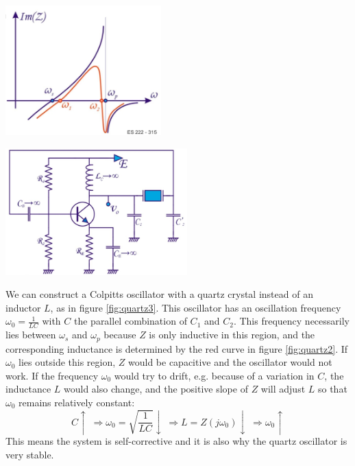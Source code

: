 \begin{minipage}{.5\textwidth}
	\centering
	\includegraphics[width=6cm]{figures/ch11/quartz2.jpg}
	\label{fig:quartz2}
\end{minipage}%
\begin{minipage}{.5\textwidth}
	\centering
	\includegraphics[width=7cm]{figures/ch11/quartz3.jpg}
	\label{fig:quartz3}
\end{minipage}

We can construct a Colpitts oscillator with a quartz crystal instead of an inductor $L$, as in figure \ref{fig:quartz3}. This oscillator has an oscillation frequency $\omega_0 = \frac{1}{LC}$ with $C$ the parallel combination of $C_1$ and $C_2$. This frequency necessarily lies between $\omega_s$ and $\omega_p$ because $Z$ is only inductive in this region, and the corresponding inductance is determined by the red curve in figure \ref{fig:quartz2}. If $\omega_0$ lies outside this region, $Z$ would be capacitive and the oscillator would not work. If the frequency $\omega_0$ would try to drift, e.g. because of a variation in $C$, the inductance $L$ would also change, and the positive slope of $Z$ will adjust $L$ so that $\omega_0$ remains relatively constant: 
$$C \uparrow  \; \Rightarrow \omega_0 = \sqrt{\frac{1}{LC}} \downarrow \; \Rightarrow L = Z(j\omega_0) \downarrow  \; \Rightarrow \omega_0 \uparrow$$
This means the system is self-corrective and it is also why the quartz oscillator is very stable.


